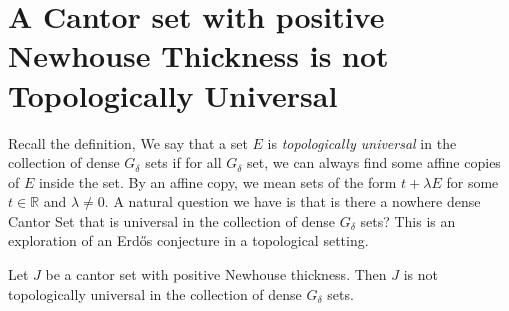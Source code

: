 \section{A Cantor set with positive Newhouse Thickness is not Topologically Universal}

Recall the definition, 
We  say that a set $E$ is  {\it topologically universal} in the collection of dense $G_{\delta}$ sets if for all $G_{\delta}$ set,  we can  always find some affine copies of $E$ inside the set. By an affine copy, we  mean sets of  the form $t+\lambda E$ for some $t\in{\mathbb R}$ and $\lambda\ne 0$. A natural question we have is that  is there a nowhere dense Cantor Set that is universal in the collection of dense $G_\delta$ sets? This is an exploration of an Erd\H{o}s conjecture in a topological setting. 

\begin{theorem}\label{theorem_positive_NW}
Let $J$ be a cantor set with positive Newhouse thickness.  Then $J$ is not topologically universal in the collection of dense $G_\delta$ sets.
\end{theorem}

